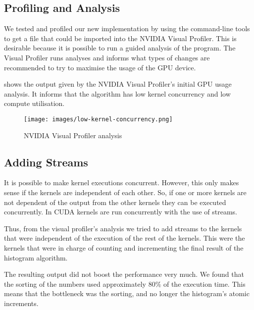 \subsection{Profiling and Analysis}

We tested and profiled our new implementation by using the  command-line tools to get a file that could be imported into the NVIDIA Visual Profiler.
This is desirable because it is possible to run a guided analysis of the program.
The Visual Profiler runs analyses and informs what types of changes are recommended to try to maximise the usage of the GPU device.

 shows the output given by the NVIDIA Visual Profiler's initial GPU usage analysis.
It informs that the algorithm has low kernel concurrency and low compute utilisation.

\begin{figure}[htb]
  \centering
  \texttt{[image: images/low-kernel-concurrency.png]}
  \caption{NVIDIA Visual Profiler analysis}
  \label{fig:first impl}
\end{figure}

\subsection{Adding Streams}

It is possible to make kernel executions concurrent.
However, this only makes sense if the kernels are independent of each other.
So, if one or more kernels are not dependent of the output from the other kernels they can be executed concurrently.
In CUDA kernels are run concurrently with the use of streams.

Thus, from the visual profiler's analysis we tried to add streams to the kernels that were independent of the execution of the rest of the kernels.
This were the kernels that were in charge of counting and incrementing the final result of the histogram algorithm.


The resulting output did not boost the performance very much.
We found that the sorting of the numbers used approximately $80\%$ of the execution time.
This means that the bottleneck was the sorting, and no longer the histogram's atomic increments.
